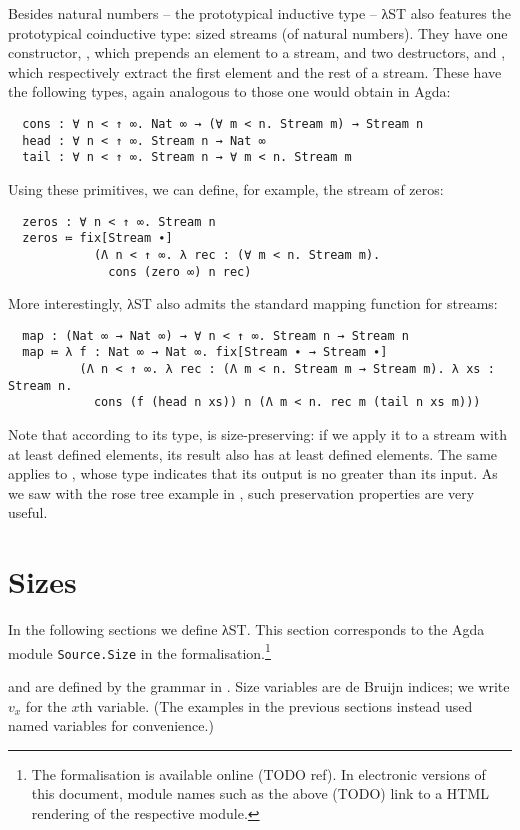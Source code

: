 Besides natural numbers -- the prototypical inductive type -- λST also features
the prototypical coinductive type: sized streams (of natural numbers). They have
one constructor, , which prepends an element to a stream, and two
destructors,  and , which respectively extract the first
element and the rest of a stream. These have the following types, again
analogous to those one would obtain in Agda:
\begin{verbatim}
  cons : ∀ n < ↑ ∞. Nat ∞ → (∀ m < n. Stream m) → Stream n
  head : ∀ n < ↑ ∞. Stream n → Nat ∞
  tail : ∀ n < ↑ ∞. Stream n → ∀ m < n. Stream m
\end{verbatim}
Using these primitives, we can define, for example, the stream of zeros:
\begin{verbatim}
  zeros : ∀ n < ↑ ∞. Stream n
  zeros ≔ fix[Stream ∙]
            (Λ n < ↑ ∞. λ rec : (∀ m < n. Stream m).
              cons (zero ∞) n rec)
\end{verbatim}
More interestingly, λST also admits the standard mapping function for streams:
\begin{verbatim}
  map : (Nat ∞ → Nat ∞) → ∀ n < ↑ ∞. Stream n → Stream n
  map ≔ λ f : Nat ∞ → Nat ∞. fix[Stream ∙ → Stream ∙]
          (Λ n < ↑ ∞. λ rec : (Λ m < n. Stream m → Stream m). λ xs : Stream n.
            cons (f (head n xs)) n (Λ m < n. rec m (tail n xs m)))
\end{verbatim}
Note that according to its type,  is size-preserving: if we apply it
to a stream with at least  defined elements, its result also has at
least  defined elements. The same applies to , whose type
indicates that its output is no greater than its input. As we saw with the rose
tree example in , such preservation properties are very
useful.


\section{Sizes}
\label{sec:source:sizes}

In the following sections we define λST. This section corresponds to the Agda
module \texttt{Source.\allowbreak Size} in the formalisation.\footnote{The
  formalisation is available online (TODO ref). In electronic versions of this
  document, module names such as the above (TODO) link to a HTML rendering of
  the respective module.}

 and  are defined by the grammar in
. Size variables are de Bruijn indices; we write $v_x$ for
the $x$th variable. (The examples in the previous sections instead used named
variables for convenience.)

